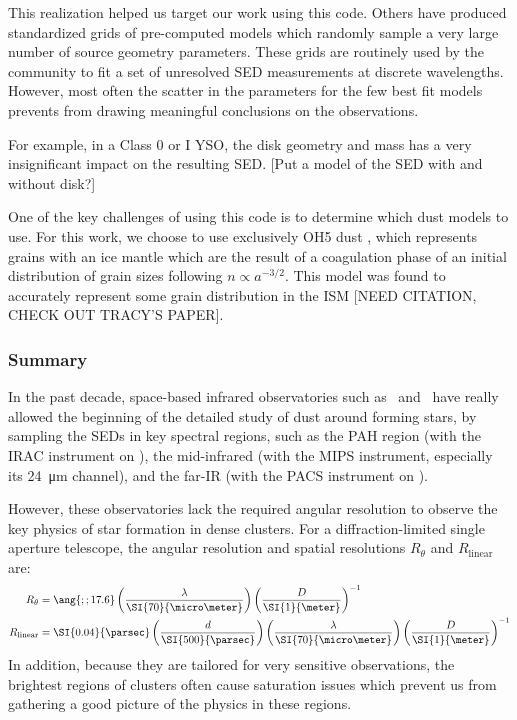 This realization helped us target our work using this code. Others \citep[e.g][]{Robitaille:2006cb} have produced standardized grids of pre-computed models which randomly sample a very large number of source geometry parameters. These grids are routinely used by the community to fit a set of unresolved SED measurements at discrete wavelengths. However, most often the scatter in the parameters for the few best fit models prevents from drawing meaningful conclusions on the observations. 

For example, in a Class 0 or I YSO, the disk geometry and mass has a very insignificant impact on the resulting SED. [Put a model of the SED with and without disk?]

One of the key challenges of using this code is to determine which dust models to use. For this work, we choose to use exclusively OH5 dust \citep{Ossenkopf:1994tq}, which represents grains with an ice mantle which are the result of a coagulation phase of an initial distribution of grain sizes following $n\propto a^{-3/2}$. This model was found to accurately represent some grain distribution in the ISM [NEED CITATION, CHECK OUT TRACY'S PAPER].

\subsubsection{Summary}

In the past decade, space-based infrared observatories such as \Spitzer\ and \Herschel\ have really allowed the beginning of the detailed study of dust around forming stars, by sampling the SEDs in key spectral regions, such as the PAH region (with the IRAC instrument on \Spitzer), the mid-infrared (with the MIPS instrument, especially its \SI{24}{\micro\meter} channel), and the far-IR (with the PACS instrument on \Herschel). 

However, these observatories lack the required angular resolution to observe the key physics of star formation in dense clusters. For a diffraction-limited single aperture telescope, the angular resolution and spatial resolutions $R_\theta$ and $R_\textrm{linear}$ are:
\begin{align}
R_\theta &= \ang{;;17.6}\left(\frac{\lambda}{\SI{70}{\micro\meter}}\right)\left(\frac{D}{\SI{1}{\meter}}\right)^{-1} \\
R_\textrm{linear} &= \SI{0.04}{\parsec}\left(\frac{d}{\SI{500}{\parsec}}\right)\left(\frac{\lambda}{\SI{70}{\micro\meter}}\right)\left(\frac{D}{\SI{1}{\meter}}\right)^{-1}
\end{align}
In addition, because they are tailored for very sensitive observations, the brightest regions of clusters often cause saturation issues which prevent us from gathering a good picture of the physics in these regions.


